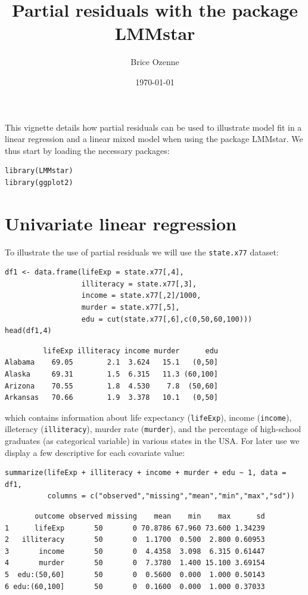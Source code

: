 \documentclass[12pt]{article}
\author{Brice Ozenne}
\date{\today}
\title{Partial residuals with the package LMMstar}
\begin{document}
\maketitle
This vignette details how partial residuals can be used to illustrate
model fit in a linear regression and a linear mixed model when using
the package LMMstar. We thus start by loading the necessary packages:
\lstset{language=r,label= ,caption= ,captionpos=b,numbers=none}
\begin{lstlisting}
library(LMMstar)
library(ggplot2)
\end{lstlisting}


\section{Univariate linear regression}
\label{sec:org82717b8}

To illustrate the use of partial residuals we will use the \texttt{state.x77}
dataset:
\lstset{language=r,label= ,caption= ,captionpos=b,numbers=none}
\begin{lstlisting}
df1 <- data.frame(lifeExp = state.x77[,4],
                  illiteracy = state.x77[,3],
                  income = state.x77[,2]/1000,
                  murder = state.x77[,5],
                  edu = cut(state.x77[,6],c(0,50,60,100)))
head(df1,4)
\end{lstlisting}

\begin{verbatim}
         lifeExp illiteracy income murder      edu
Alabama    69.05        2.1  3.624   15.1   (0,50]
Alaska     69.31        1.5  6.315   11.3 (60,100]
Arizona    70.55        1.8  4.530    7.8  (50,60]
Arkansas   70.66        1.9  3.378   10.1   (0,50]
\end{verbatim}


 which contains information about life expectancy (\texttt{lifeExp}), income
(\texttt{income}), illeteracy (\texttt{illiteracy}), murder rate (\texttt{murder}), and the
percentage of high-school graduates (as categorical variable) in
various states in the USA. For later use we display a few descriptive
for each covariate value:
\lstset{language=r,label= ,caption= ,captionpos=b,numbers=none}
\begin{lstlisting}
summarize(lifeExp + illiteracy + income + murder + edu ~ 1, data = df1,
          columns = c("observed","missing","mean","min","max","sd"))
\end{lstlisting}

\begin{verbatim}
       outcome observed missing    mean    min    max      sd
1      lifeExp       50       0 70.8786 67.960 73.600 1.34239
2   illiteracy       50       0  1.1700  0.500  2.800 0.60953
3       income       50       0  4.4358  3.098  6.315 0.61447
4       murder       50       0  7.3780  1.400 15.100 3.69154
5  edu:(50,60]       50       0  0.5600  0.000  1.000 0.50143
6 edu:(60,100]       50       0  0.1600  0.000  1.000 0.37033
\end{verbatim}
\end{document}

